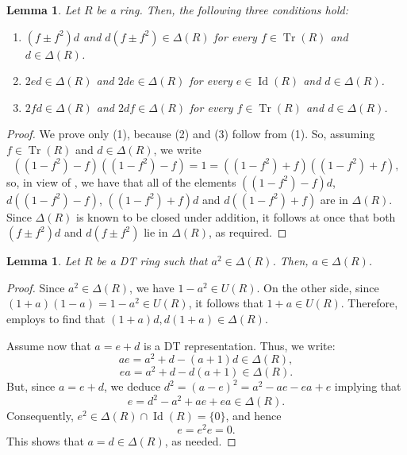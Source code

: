 \documentclass[12pt]{amsart}
\newtheorem{lemma}[theorem]{Lemma}
\theoremstyle{definition}
\begin{document}
\begin{lemma}\label{prop d,e}
Let $R$ be a ring. Then, the following three conditions hold:
\begin{enumerate}
    \item $(f \pm f^2)d$ and $d(f \pm f^2) \in \Delta(R)$ for every $f \in \operatorname{Tr}(R)$ and $d \in \Delta(R)$.
    \item $2ed \in \Delta(R)$ and $2de \in \Delta(R)$ for every $e \in \operatorname{Id}(R)$ and $d \in \Delta(R)$.
    \item $2fd \in \Delta(R)$ and $2df \in \Delta(R)$ for every $f \in \operatorname{Tr}(R)$ and $d \in \Delta(R)$.
\end{enumerate}
\end{lemma}

\begin{proof}
We prove only (1), because (2) and (3) follow from (1). So, assuming $f \in \operatorname{Tr}(R)$ and $d \in \Delta(R)$, we write
\[
((1 - f^2) - f)((1 - f^2) - f) = 1 = ((1 - f^2) + f)((1 - f^2) + f),
\]
so, in view of \cite[Lemma 1(2)]{lmr}, we have that all of the elements $((1 - f^2) - f)d$, $d((1 - f^2) - f)$, $((1 - f^2) + f)d$ and $d((1 - f^2) + f)$ are in $\Delta(R)$. Since $\Delta(R)$ is known to be closed under addition, it follows at once that both $(f \pm f^2)d$ and $d(f \pm f^2)$ lie in $\Delta(R)$, as required.
\end{proof}

\begin{lemma}\label{power a then a}
Let $R$ be a DT ring such that $a^2 \in \Delta(R)$. Then, $a \in \Delta(R)$.
\end{lemma}

\begin{proof}
Since $a^2 \in \Delta(R)$, we have $1 - a^2 \in U(R)$. On the other side, since $(1 + a)(1 - a) = 1 - a^2 \in U(R)$, it follows that $1 + a \in U(R)$. Therefore, \cite[Lemma 1(2)]{lmr} employs to find that $(1 + a)d, d(1 + a) \in \Delta(R)$.

Assume now that $a = e + d$ is a DT representation. Thus, we write:
\[
ae = a^2 + d - (a + 1)d \in \Delta(R),
\]
\[
ea = a^2 + d - d(a + 1) \in \Delta(R).
\]
But, since $a = e + d$, we deduce $d^2 = (a - e)^2 = a^2 - ae - ea + e$ implying that
\[
e = d^2 - a^2 + ae + ea \in \Delta(R).
\]
Consequently, $e^2 \in \Delta(R) \cap \operatorname{Id}(R) = \{0\}$, and hence
\[
e = e^2 e = 0.
\]
This shows that $a = d \in \Delta(R)$, as needed.
\end{proof}
\end{document}
